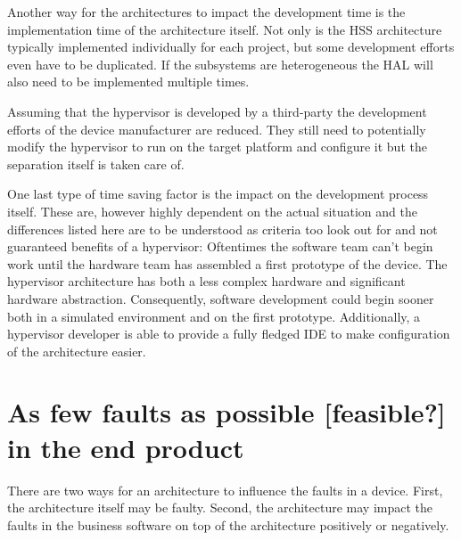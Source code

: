 Another way for the architectures to impact the development time is the implementation time of the architecture itself. Not only is the \gls{HSS} architecture typically implemented individually for each project, but some development efforts even have to be duplicated. If the subsystems are heterogeneous the \gls{HAL} will also need to be implemented multiple times. 

Assuming that the hypervisor is developed by a third-party the development efforts of the device manufacturer are reduced. They still need to potentially modify the hypervisor to run on the target platform and configure it but the separation itself is taken care of.

One last type of time saving factor is the impact on the development process itself. These are, however highly dependent on the actual situation and the differences listed here are to be understood as criteria too look out for and not guaranteed benefits of a hypervisor: Oftentimes the software team can't begin work until the hardware team has assembled a first prototype of the device. The hypervisor architecture has both a less complex hardware and significant hardware abstraction. Consequently, software development could begin sooner both in a simulated environment and on the first prototype. Additionally, a hypervisor developer is able to provide a fully fledged \gls{IDE} to make configuration of the architecture easier.


\section{As few faults as possible [feasible?] in the end product}
There are two ways for an architecture to influence the faults in a device. First, the architecture itself may be faulty. Second, the architecture may impact the faults in the business software on top of the architecture positively or negatively.

